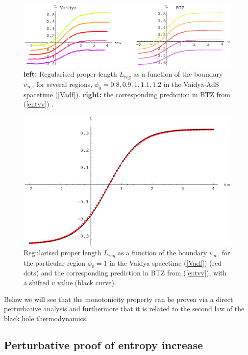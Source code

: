 \documentclass[12pt]{article}
\def\pho{\phi_0}
\begin{document}
\begin{figure}[htbp]
\begin{center}
\includegraphics[width=6.5in]{Lvar_Vad}
\caption{{\bf left:} Regularised proper length $L_{reg}$ as a function of
the boundary $v_{\infty}$, for several regions,
$\pho=0.8,0.9,1,1.1,1.2$ in the Vaidya-AdS spacetime (\ref{Vadf}). {\bf
right:} the corresponding prediction in BTZ from (\ref{entvv}) . }
\label{LvarVad}
\end{center}
\end{figure}
%
\begin{figure}[htbp]
\begin{center}
\includegraphics[width=4.5in]{Lvar_fit_Vad}
\caption{ Regularised proper length $L_{reg}$ as a function of the
boundary $v_{\infty}$, for the particular region $\pho=1$ in the
Vaidya spacetime (\ref{Vadf}) (red dots) and the corresponding
prediction in BTZ from (\ref{entvv}), with a shifted $v$ value
(black curve). } \label{LvarfitVad}
\end{center}
\end{figure}
%

Below we will see that the monotonicity property can be proven via a
direct perturbative analysis and furthermore that it is related to
 the second law of the black hole thermodynamics.

\subsection{Perturbative proof of entropy increase}
\end{document}
